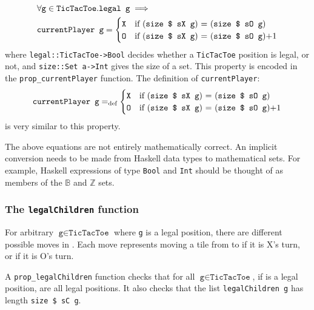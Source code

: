 \begin{equation}
\begin{split}
&\forall\texttt{g}\in\texttt{TicTacToe}.\texttt{legal g}\implies\\
&\texttt{currentPlayer g} =
\begin{cases}
\texttt{X} & \text{if (\texttt{size \$ sX g}) $=$ (\texttt{size \$ sO g}})\\
\texttt{\texttt{O}} & \text{if (\texttt{size \$ sX g}) $=$ (\texttt{size \$ sO g})$+1$}\\
\end{cases}
\end{split}
\nonumber
\end{equation}
where \verb|legal::TicTacToe->Bool| decides whether a \verb|TicTacToe| position is legal, or not, and \verb|size::Set a->Int| gives the size of a set. This property is encoded in the \texttt{prop{\_}currentPlayer} function. The definition of \verb|currentPlayer|:
\begin{equation}
\texttt{currentPlayer g} =_{\text{def}}
\begin{cases}
\texttt{X} & \text{if (\texttt{size \$ sX g}) $=$ (\texttt{size \$ sO g}})\\
\texttt{\texttt{O}} & \text{if (\texttt{size \$ sX g}) $=$ (\texttt{size \$ sO g})$+1$}
\end{cases}
\nonumber
\end{equation}
is very similar to this property.

The above equations are not entirely mathematically correct. An implicit conversion needs to be made from Haskell data types to mathematical sets. For example, Haskell expressions of type \verb|Bool| and \verb|Int| should be thought of as members of the $\mathbb{B}$ and $\mathbb{Z}$ sets.

\subsubsection{The \texttt{legalChildren} function}
For arbitrary $\texttt{g}\in\texttt{TicTacToe}$ 
where \texttt{g} is a legal position, there are  different possible moves in . Each move represents moving a tile from  to  if it is X's turn, or  if it is O's turn. 


A \verb|prop_legalChildren| function checks that for all $\texttt{g}\in\texttt{TicTacToe}$, if  is a legal position,  are all legal positions. It also checks that the list \texttt{legalChildren g} has length \texttt{size \$ sC g}.

